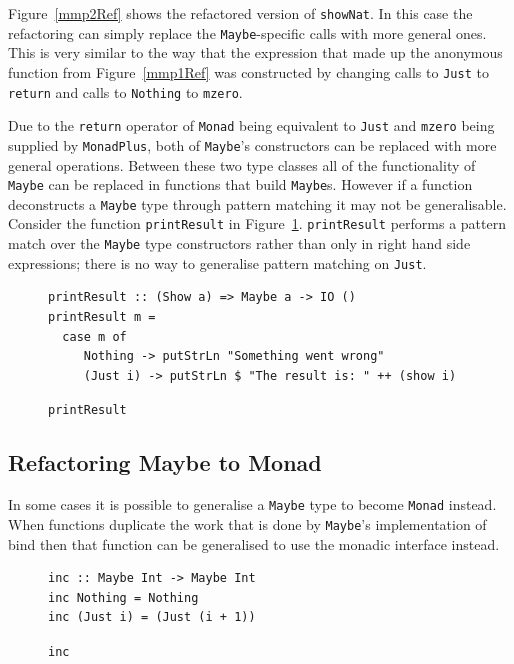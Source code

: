 Figure~\ref{mmp2Ref} shows the refactored version of \texttt{showNat}. In this case the refactoring can simply replace the \texttt{Maybe}-specific calls with more general ones. This is very similar to the way that the expression that made up the anonymous function from Figure~\ref{mmp1Ref} was constructed by changing calls to \texttt{Just} to \texttt{return} and calls to \texttt{Nothing} to \texttt{mzero}. 

Due to the \texttt{return} operator of \texttt{Monad} being equivalent to \texttt{Just} and \texttt{mzero} being supplied by \texttt{MonadPlus}, both of \texttt{Maybe}'s constructors can be replaced with more general operations. Between these two type classes all of the functionality of \texttt{Maybe} can be replaced in functions that build \texttt{Maybe}s. However if a function deconstructs a \texttt{Maybe} type through pattern matching it may not be generalisable. Consider the function \texttt{printResult} in Figure~\ref{printRes}. \texttt{printResult} performs a pattern match over the \texttt{Maybe} type constructors rather than only in right hand side expressions; there is no way to generalise pattern matching on \texttt{Just}.

\begin{figure}[t]
\begin{lstlisting}
printResult :: (Show a) => Maybe a -> IO ()
printResult m =
  case m of
     Nothing -> putStrLn "Something went wrong"
     (Just i) -> putStrLn $ "The result is: " ++ (show i)
\end{lstlisting}
\caption{\texttt{printResult}}
\label{printRes}
\end{figure}

\subsection{Refactoring Maybe to Monad}
\label{genMonad}

In some cases it is possible to generalise a \texttt{Maybe} type to become \texttt{Monad} instead. When functions duplicate the work that is done by \texttt{Maybe}'s implementation of bind then that function can be generalised to use the monadic interface instead.

\begin{figure}[t]
\begin{lstlisting}
inc :: Maybe Int -> Maybe Int
inc Nothing = Nothing
inc (Just i) = (Just (i + 1))
\end{lstlisting}
\caption{\texttt{inc}}
\label{mmp1}
\end{figure}

